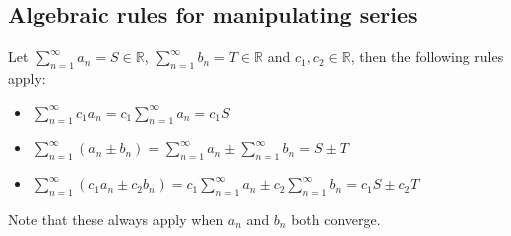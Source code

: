 \documentclass[11pt, a4paper]{article}
\newcommand*{\R}{\ensuremath{\mathbb{R}}}
\begin{document}
\subsection{Algebraic rules for manipulating series}
Let $\sum_{n=1}^{\infty} a_n = S \in \R$, $\sum_{n=1}^{\infty} b_n = T \in \R$ and $c_1,c_2 \in \R$, then the following rules apply:
\begin{itemize}
  \item $\sum_{n=1}^{\infty} c_1a_n = c_1\sum_{n=1}^{\infty} a_n = c_1S$
  \item $\sum_{n=1}^{\infty} (a_n \pm b_n) = \sum_{n=1}^{\infty} a_n \pm \sum_{n=1}^{\infty} b_n = S \pm T$
  \item $\sum_{n=1}^{\infty} (c_1a_n \pm c_2b_n) = c_1\sum_{n=1}^{\infty} a_n \pm c_2\sum_{n=1}^{\infty} b_n = c_1S \pm c_2T$
\end{itemize}
Note that these always apply when $a_n$ and $b_n$ both converge.
\end{document}
